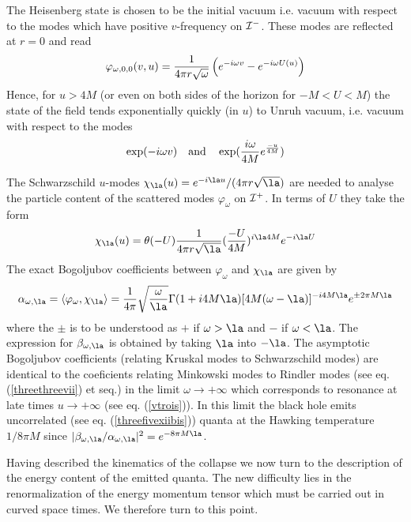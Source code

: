 The Heisenberg state is chosen to be the initial vacuum
i.e. vacuum with respect to the modes which have positive
$v$-frequency on ${\cal I}^-$. These modes are reflected at $r=0$ and read
\begin{equation}
\varphi_{\omega,0,0}(v,u) = {1 \over 4 \pi r \sqrt{\omega}}
\left( e^{-i \omega v} - e^{-i\omega U(u)} \right)
\label{modesphi}
\end{equation}
Hence, for $u > 4M$ (or even on both sides of the horizon for $-M < U < M$)
 the state of the field tends exponentially quickly (in $u$) to Unruh
vacuum\cite{Unruh}, i.e.
vacuum with respect to the modes
\begin{equation}
\exp(-i \omega v) \quad {\hbox{and}}\quad \exp({i\omega \over 4
M} e^{-u\over 4
M})
\end{equation}

The Schwarzschild $u$-modes  $\chi_{\la}(u)= {e^{-i\la u}}/( 4 \pi r
\sqrt{
\la}) $
are needed to analyse
the particle content
of the scattered modes
$\varphi_{\omega}$
on ${\cal I^+}$. In terms of $U$ they take the form
\begin{equation}
\chi_{\la}(u) =  \theta(- U){1 \over  4 \pi r
\sqrt{\la}}
 ({-U \over 4M} )^{i \la 4 M} e^{- i \la U}
\end{equation}
The exact Bogoljubov coefficients between $\varphi_\omega$ and $\chi_{\la}$
are given by
\begin{equation}
\alpha_{\omega,\la} =
\bk{\varphi_\omega,\chi_{\la}}
= {1 \over 4 \pi}
\sqrt{ \omega \over \la}
\Gamma ( 1 + i 4 M \la)
[ 4 M ( \omega - \la)]^{-i 4 M \la}
e^{\pm 2 \pi M \la}
\end{equation}
where the $\pm$ is to be understood as $+$ if $ \omega > \la$ and $-$
if $ \omega < \la$. The expression for $\beta_{\omega,\la}$ is obtained by
taking $\la$ into $-\la$. The asymptotic Bogoljubov coefficients
(relating Kruskal modes to Schwarzschild modes) are identical to the
coeficients
relating Minkowski modes to Rindler modes (see
eq. (\ref{threethreevii}) et seq.)
in the
limit $\omega \to + \infty$ which corresponds to resonance at late times
$u \to +\infty$ (see eq. (\ref{vtrois})). In this limit
the black hole emits uncorrelated (see eq. (\ref{threefivexiibis}))
quanta at the Hawking temperature $1/8 \pi M$
 since $\vert \beta_{\omega,\la}/ \alpha_{\omega,\la}\vert ^2 =
e^{-8 \pi M \la} $.

Having described the kinematics of the collapse we now turn to the
description of the energy content of the emitted quanta.
The
new difficulty lies in the
renormalization of the energy momentum tensor which must be carried out
in curved space times. We therefore turn to this point.


